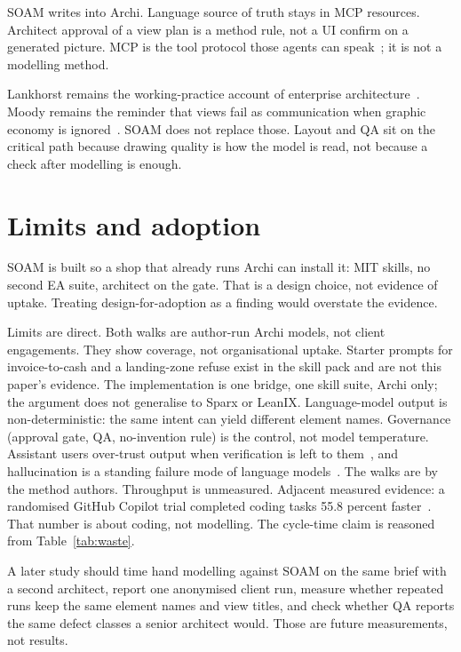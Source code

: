 \documentclass[10pt,journal,compsoc]{IEEEtran}
\begin{document}
SOAM writes into Archi. Language source of truth stays in MCP resources. Architect approval of a view plan is a method rule, not a UI confirm on a generated picture. MCP is the tool protocol those agents can speak~\cite{mcp2025}; it is not a modelling method.

Lankhorst remains the working-practice account of enterprise architecture~\cite{lankhorst2017}. Moody remains the reminder that views fail as communication when graphic economy is ignored~\cite{moody2009}. SOAM does not replace those. Layout and QA sit on the critical path because drawing quality is how the model is read, not because a check after modelling is enough.

\section{Limits and adoption}

SOAM is built so a shop that already runs Archi can install it: MIT skills, no second EA suite, architect on the gate. That is a design choice, not evidence of uptake. Treating design-for-adoption as a finding would overstate the evidence.

Limits are direct. Both walks are author-run Archi models, not client engagements. They show coverage, not organisational uptake. Starter prompts for invoice-to-cash and a landing-zone refuse exist in the skill pack and are not this paper's evidence. The implementation is one bridge, one skill suite, Archi only; the argument does not generalise to Sparx or LeanIX. Language-model output is non-deterministic: the same intent can yield different element names. Governance (approval gate, QA, no-invention rule) is the control, not model temperature. Assistant users over-trust output when verification is left to them~\cite{perry2023}, and hallucination is a standing failure mode of language models~\cite{ji2023}. The walks are by the method authors. Throughput is unmeasured. Adjacent measured evidence: a randomised GitHub Copilot trial completed coding tasks 55.8 percent faster~\cite{peng2023}. That number is about coding, not modelling. The cycle-time claim is reasoned from Table~\ref{tab:waste}.

A later study should time hand modelling against SOAM on the same brief with a second architect, report one anonymised client run, measure whether repeated runs keep the same element names and view titles, and check whether QA reports the same defect classes a senior architect would. Those are future measurements, not results.
\end{document}
